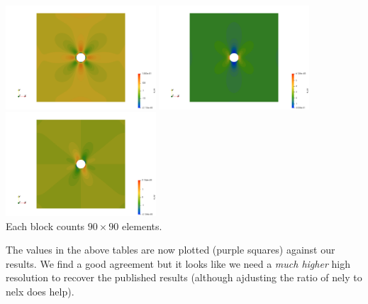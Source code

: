 \begin{center}
\includegraphics[width=5.6cm]{python_codes/fieldstone_124/results/exp3/exx}
\includegraphics[width=5.6cm]{python_codes/fieldstone_124/results/exp3/eyy}
\includegraphics[width=5.6cm]{python_codes/fieldstone_124/results/exp3/exy}\\
{\captionfont Each block counts $90\times 90$ elements.}
\end{center}

The values in the above tables are now plotted (purple squares) against our results. 
We find a good agreement but it looks like we need a {\it much higher}
high resolution to recover the published results (although ajdusting the 
ratio of nely to nelx does help). 

